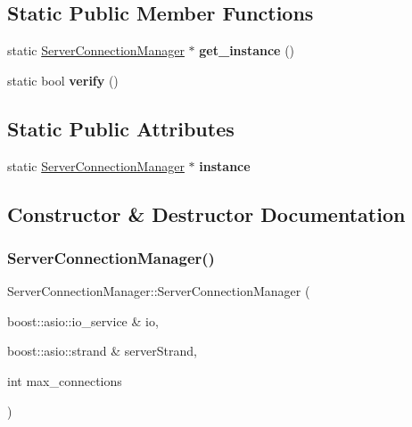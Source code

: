 \subsection*{Static Public Member Functions}
\begin{DoxyCompactItemize}
\item 
\mbox{\label{class_server_connection_manager_a548c5d053584a2a0bf18a1422a802b95}} 
static \hyperlink{class_server_connection_manager}{Server\+Connection\+Manager} $\ast$ {\bfseries get\+\_\+instance} ()
\item 
\mbox{\label{class_server_connection_manager_a2aabc84134814ff480b8214bda06cb26}} 
static bool {\bfseries verify} ()
\end{DoxyCompactItemize}
\subsection*{Static Public Attributes}
\begin{DoxyCompactItemize}
\item 
\mbox{\label{class_server_connection_manager_a79204557e4949379c3197dd476d74ccb}} 
static \hyperlink{class_server_connection_manager}{Server\+Connection\+Manager} $\ast$ {\bfseries instance}
\end{DoxyCompactItemize}


\subsection{Constructor \& Destructor Documentation}
\mbox{\label{class_server_connection_manager_a0b2c91c8c5f07706cbec0bb08de8039d}} 
\subsubsection{\texorpdfstring{Server\+Connection\+Manager()}{ServerConnectionManager()}}
{\footnotesize\ttfamily Server\+Connection\+Manager\+::\+Server\+Connection\+Manager (\begin{DoxyParamCaption}\item[{boost\+::asio\+::io\+\_\+service \&}]{io,  }\item[{boost\+::asio\+::strand \&}]{server\+Strand,  }\item[{int}]{max\+\_\+connections }\end{DoxyParamCaption})}

